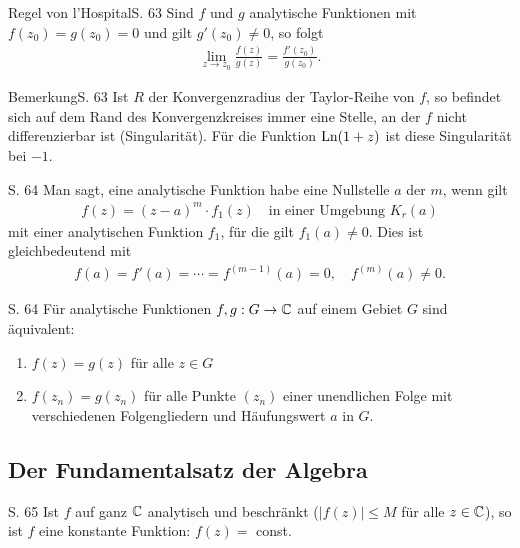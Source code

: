 \begin{bemerkung}{Regel von l'Hospital}{S. 63}
  Sind $f$ und $g$ analytische Funktionen mit $f(z_0) = g(z_0) = 0$ und gilt $g'(z_0) \neq 0$, so folgt
  \begin{align}
    \lim_{z \to z_0} \frac{f(z)}{g(z)} = \frac{f'(z_0)}{g(z_0)} .
  \end{align}
\end{bemerkung}

\begin{bemerkung}{Bemerkung}{S. 63}
  Ist $R$ der Konvergenzradius der Taylor-Reihe von $f$, so befindet sich auf dem Rand des Konvergenzkreises immer eine Stelle, an der $f$ nicht differenzierbar ist (\glqq Singularität\grqq).
  Für die Funktion $\operatorname{Ln}(1+z)$ ist diese Singularität bei $-1$.
\end{bemerkung}

\begin{definition}{S. 64}
  \label{def:6_1}
  Man sagt, eine analytische Funktion habe eine Nullstelle $a$ der  $m$, wenn gilt
  \begin{align}
    f(z) = (z - a)^m \cdot f_1(z) \quad \text{in einer Umgebung } K_r(a)
  \end{align}
  mit einer analytischen Funktion $f_1$, für die gilt $f_1(a) \neq 0$.
  Dies ist gleichbedeutend mit
  \begin{align}
    f(a) = f'(a) = \cdots = f^{(m-1)}(a) = 0, \quad f^{(m)}(a) \neq 0 .
  \end{align}
\end{definition}

\begin{satz}[Identitätssatz]{S. 64}
  \label{satz:6_3}
  Für analytische Funktionen $f, g: G \to \mathbb{C}$ auf einem Gebiet $G$ sind äquivalent:
  \begin{enumerate}[label=\alph*)]
    \item $f(z) = g(z)$ für alle $z \in G$
    \item $f(z_n) = g(z_n)$ für alle Punkte $(z_n)$ einer unendlichen Folge mit verschiedenen Folgengliedern und Häufungswert $a$ in $G$.
  \end{enumerate}
\end{satz}



\subsection{Der Fundamentalsatz der Algebra}

\begin{satz}{S. 65}
  \label{satz:6_4}
  Ist $f$ auf ganz $\mathbb{C}$ analytisch und beschränkt ($|f(z)| \leq M$ für alle $z \in \mathbb{C}$), so ist $f$ eine konstante Funktion: $f(z) =$ const.
\end{satz}

